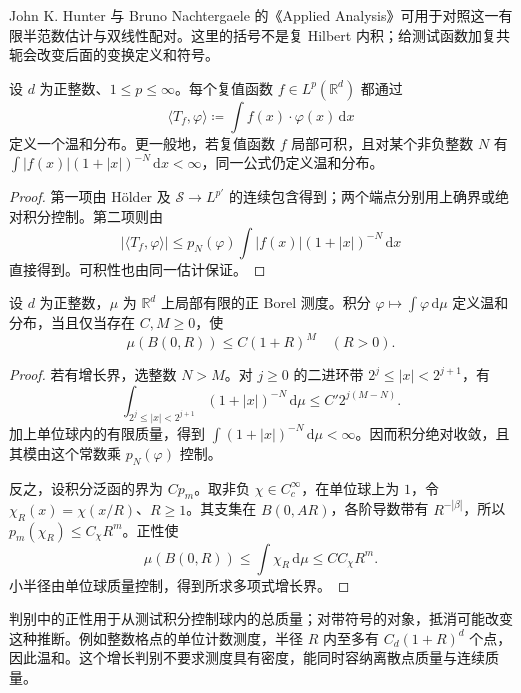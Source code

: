 John K. Hunter 与 Bruno Nachtergaele 的《Applied Analysis》\cite[Section 11.2, p. 291; p. 294]{Hunter2001Applied}可用于对照这一有限半范数估计与双线性配对。这里的括号不是复 Hilbert 内积；给测试函数加复共轭会改变后面的变换定义和符号。

\begin{proposition}\label{b2:prop:05-regular-tempered}
设 \(d\) 为正整数、\(1\leq p\leq\infty\)。每个复值函数 \(f\in L^p(\mathbb R^d)\) 都通过
\[
 \langle T_f,\varphi\rangle\coloneqq\int f(x)\cdot\varphi(x)\,\mathrm{d}x
\]
定义一个温和分布。更一般地，若复值函数 \(f\) 局部可积，且对某个非负整数 \(N\) 有 \(\int|f(x)|(1+|x|)^{-N}\,\mathrm{d}x<\infty\)，同一公式仍定义温和分布。
\end{proposition}
\begin{proof}
第一项由 Hölder 及 \(\mathcal S\to L^{p'}\) 的连续包含得到；两个端点分别用上确界或绝对积分控制。第二项则由
\[
 |\langle T_f,\varphi\rangle|
 \leq p_N(\varphi)\int|f(x)|(1+|x|)^{-N}\,\mathrm{d}x
\]
直接得到。可积性也由同一估计保证。
\end{proof}

\begin{proposition}[正测度的增长判别]\label{b2:prop:05-positive-tempered-measure}
设 \(d\) 为正整数，\(\mu\) 为 \(\mathbb R^d\) 上局部有限的正 Borel 测度。积分 \(\varphi\mapsto\int\varphi\,\mathrm{d}\mu\) 定义温和分布，当且仅当存在 \(C,M\geq0\)，使
\[
 \mu(B(0,R))\leq C(1+R)^M\quad(R>0).
\]
\end{proposition}
\begin{proof}
若有增长界，选整数 \(N>M\)。对 \(j\geq0\) 的二进环带 \(2^j\leq|x|<2^{j+1}\)，有
\[
 \int_{2^j\leq|x|<2^{j+1}}(1+|x|)^{-N}\,\mathrm{d}\mu
 \leq C'2^{j(M-N)}.
\]
加上单位球内的有限质量，得到 \(\int(1+|x|)^{-N}\,\mathrm{d}\mu<\infty\)。因而积分绝对收敛，且其模由这个常数乘 \(p_N(\varphi)\) 控制。

反之，设积分泛函的界为 \(Cp_m\)。取非负 \(\chi\in C_c^\infty\)，在单位球上为 \(1\)，令 \(\chi_R(x)=\chi(x/R)\)、\(R\geq1\)。其支集在 \(B(0,AR)\)，各阶导数带有 \(R^{-|\beta|}\)，所以 \(p_m(\chi_R)\leq C_\chi R^m\)。正性使
\[
 \mu(B(0,R))\leq\int\chi_R\,\mathrm{d}\mu\leq CC_\chi R^m.
\]
小半径由单位球质量控制，得到所求多项式增长界。
\end{proof}

判别中的正性用于从测试积分控制球内的总质量；对带符号的对象，抵消可能改变这种推断。例如整数格点的单位计数测度，半径 \(R\) 内至多有 \(C_d(1+R)^d\) 个点，因此温和。这个增长判别不要求测度具有密度，能同时容纳离散点质量与连续质量。

